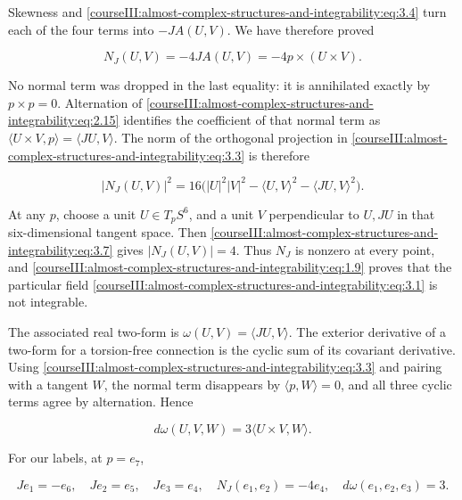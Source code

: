 Skewness and \eqref{courseIII:almost-complex-structures-and-integrability:eq:3.4} turn each of the four terms into \(-JA(U,V)\). We have therefore proved

\begin{equation}
N_J(U,V)=-4JA(U,V)=-4p\times(U\times V).
\label{courseIII:almost-complex-structures-and-integrability:eq:3.6}
\end{equation}

No normal term was dropped in the last equality: it is annihilated exactly by \(p\times p=0\). Alternation of \eqref{courseIII:almost-complex-structures-and-integrability:eq:2.15} identifies the coefficient of that normal term as
\(\langle U\times V,p\rangle=\langle JU,V\rangle\). The norm of the orthogonal projection in \eqref{courseIII:almost-complex-structures-and-integrability:eq:3.3} is therefore

\begin{equation}
|N_J(U,V)|^2
=16\bigl(|U|^2|V|^2-\langle U,V\rangle^2
-\langle JU,V\rangle^2\bigr).
\label{courseIII:almost-complex-structures-and-integrability:eq:3.7}
\end{equation}

At any \(p\), choose a unit \(U\in T_pS^6\), and a unit \(V\) perpendicular to \(U,JU\) in that six-dimensional tangent space. Then \eqref{courseIII:almost-complex-structures-and-integrability:eq:3.7} gives \(|N_J(U,V)|=4\). Thus \(N_J\) is nonzero at every point, and \eqref{courseIII:almost-complex-structures-and-integrability:eq:1.9} proves that the particular field \eqref{courseIII:almost-complex-structures-and-integrability:eq:3.1} is not integrable.

The associated real two-form is \(\omega(U,V)=\langle JU,V\rangle\). The exterior derivative of a two-form for a torsion-free connection is the cyclic sum of its covariant derivative. Using \eqref{courseIII:almost-complex-structures-and-integrability:eq:3.3} and pairing with a tangent \(W\), the normal term disappears by \(\langle p,W\rangle=0\), and all three cyclic terms agree by alternation. Hence

\begin{equation}
d\omega(U,V,W)=3\langle U\times V,W\rangle.
\label{courseIII:almost-complex-structures-and-integrability:eq:3.8}
\end{equation}

For our labels, at \(p=e_7\),

\begin{equation}
Je_1=-e_6,\quad Je_2=e_5,\quad Je_3=e_4,
\quad N_J(e_1,e_2)=-4e_4,
\quad d\omega(e_1,e_2,e_3)=3.
\label{courseIII:almost-complex-structures-and-integrability:eq:3.9}
\end{equation}

